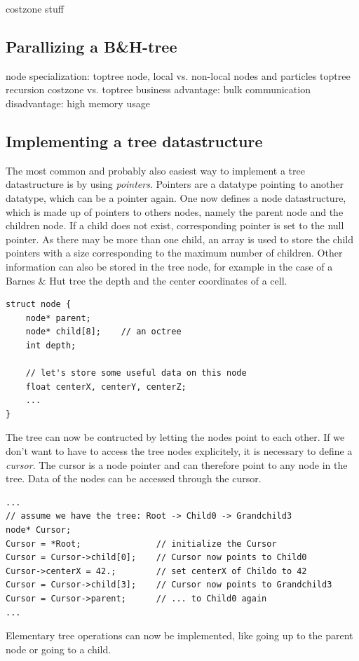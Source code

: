 costzone stuff

\subsection{Parallizing a B\&H-tree}
node specialization: toptree node, local vs. non-local nodes and particles
toptree recursion
costzone vs. toptree business
advantage: bulk communication
disadvantage: high memory usage

\subsection{Implementing a tree datastructure}
The most common and probably also easiest way to implement a tree datastructure is by using \emph{pointers}. Pointers are a datatype pointing to another datatype, which can be a pointer again. One now defines a node datastructure, which is made up of pointers to others nodes, namely the parent node and the children node. If a child does not exist, corresponding pointer is set to the null pointer. As there may be more than one child, an array is used to store the child pointers with a size corresponding to the maximum number of children. Other information can also be stored in the tree node, for example in the case of a Barnes \& Hut tree the depth and the center coordinates of a cell.
\begin{verbatim}
struct node {
    node* parent;
    node* child[8];    // an octree
    int depth;
    
    // let's store some useful data on this node
    float centerX, centerY, centerZ;
    ...
}
\end{verbatim}

The tree can now be contructed by letting the nodes point to each other. If we don't want to have to access the tree nodes explicitely, it is necessary to define a \emph{cursor}. The cursor is a node pointer and can therefore point to any node in the tree. Data of the nodes can be accessed through the cursor. 
\begin{verbatim}
...
// assume we have the tree: Root -> Child0 -> Grandchild3
node* Cursor;
Cursor = *Root;               // initialize the Cursor
Cursor = Cursor->child[0];    // Cursor now points to Child0
Cursor->centerX = 42.;        // set centerX of Childo to 42
Cursor = Cursor->child[3];    // Cursor now points to Grandchild3
Cursor = Cursor->parent;      // ... to Child0 again
...
\end{verbatim}

Elementary tree operations can now be implemented, like going up to the parent node or going to a child.\\


